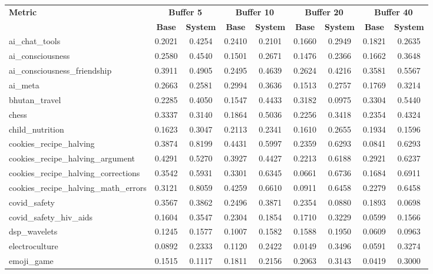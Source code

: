 \begin{landscape}
\begin{longtable}{@{}p{3.8cm}cccccccc@{}}
\toprule
\textbf{Metric} & \multicolumn{2}{c}{\textbf{Buffer 5}} & \multicolumn{2}{c}{\textbf{Buffer 10}} & \multicolumn{2}{c}{\textbf{Buffer 20}} & \multicolumn{2}{c}{\textbf{Buffer 40}} \\
\cmidrule(lr){2-3}\cmidrule(lr){4-5}\cmidrule(lr){6-7}\cmidrule(lr){8-9}
 & \textbf{Base} & \textbf{System} & \textbf{Base} & \textbf{System} & \textbf{Base} & \textbf{System} & \textbf{Base} & \textbf{System} \\
\midrule
\endhead
ai\_chat\_tools & 0.2021 & 0.4254 & 0.2410 & 0.2101 & 0.1660 & 0.2949 & 0.1821 & 0.2635 \\
ai\_consciousness & 0.2580 & 0.4540 & 0.1501 & 0.2671 & 0.1476 & 0.2366 & 0.1662 & 0.3648 \\
ai\_consciousness\_friendship & 0.3911 & 0.4905 & 0.2495 & 0.4639 & 0.2624 & 0.4216 & 0.3581 & 0.5567 \\
ai\_meta & 0.2663 & 0.2581 & 0.2994 & 0.3636 & 0.1513 & 0.2757 & 0.1769 & 0.3214 \\
bhutan\_travel & 0.2285 & 0.4050 & 0.1547 & 0.4433 & 0.3182 & 0.0975 & 0.3304 & 0.5440 \\
chess & 0.3337 & 0.3140 & 0.1864 & 0.5036 & 0.2256 & 0.3418 & 0.2354 & 0.4324 \\
child\_nutrition & 0.1623 & 0.3047 & 0.2113 & 0.2341 & 0.1610 & 0.2655 & 0.1934 & 0.1596 \\
cookies\_recipe\_halving & 0.3874 & 0.8199 & 0.4431 & 0.5997 & 0.2359 & 0.6293 & 0.0841 & 0.6293 \\
cookies\_recipe\_halving\_argument & 0.4291 & 0.5270 & 0.3927 & 0.4427 & 0.2213 & 0.6188 & 0.2921 & 0.6237 \\
cookies\_recipe\_halving\_corrections & 0.3542 & 0.5931 & 0.3301 & 0.6345 & 0.0661 & 0.6736 & 0.1684 & 0.6911 \\
cookies\_recipe\_halving\_math\_errors & 0.3121 & 0.8059 & 0.4259 & 0.6610 & 0.0911 & 0.6458 & 0.2279 & 0.6458 \\
covid\_safety & 0.3567 & 0.3862 & 0.2496 & 0.3871 & 0.2354 & 0.0880 & 0.1893 & 0.0698 \\
covid\_safety\_hiv\_aids & 0.1604 & 0.3547 & 0.2304 & 0.1854 & 0.1710 & 0.3229 & 0.0599 & 0.1566 \\
dsp\_wavelets & 0.1245 & 0.1577 & 0.1007 & 0.1582 & 0.1588 & 0.1950 & 0.0609 & 0.0963 \\
electroculture & 0.0892 & 0.2333 & 0.1120 & 0.2422 & 0.0149 & 0.3496 & 0.0591 & 0.3274 \\
emoji\_game & 0.1515 & 0.1117 & 0.1811 & 0.2156 & 0.2063 & 0.3143 & 0.0419 & 0.3000 \\

\end{longtable}
\end{landscape}
